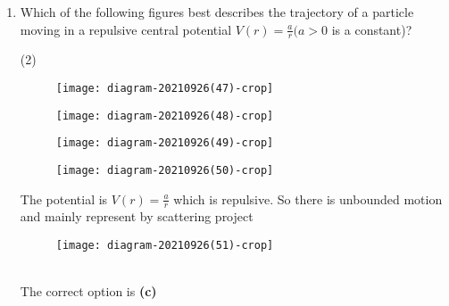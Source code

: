 \begin{enumerate}
\begin{tasks}
	\task[\textbf{A.}] $3 N$
	\task[\textbf{B.}]$2 N$
	\task[\textbf{C.}]$5 N$
	\task[\textbf{D.}]$4 N$
\end{tasks}
\begin{answer}
\begin{align*}
m&=\frac{100}{1000}=0.1 \mathrm{~kg}\\
m g h&=\frac{1}{2} m v^{2} \\
v&=\sqrt{2 g h} \\
v & =10 \mathrm{~m} / \mathrm{sec}
\intertext{change in momentum during collision}
 (m v)-(-m v)&=2 k . g m / \mathrm{sec}\\
f&=\frac{\Delta P}{\Delta t}=\frac{2}{0.5}=4 N
\end{align*}
The correct option is \textbf{(d)}	
\end{answer}
	\item Which of the following figures best describes the trajectory of a particle moving in a repulsive central potential $V(r)=\frac{a}{r}(a>0$ is a constant)?
	{}
\begin{tasks}(2)
	\task[\textbf{A.}]\begin{figure}[H]
		\centering
		\texttt{[image: diagram-20210926(47)-crop]}
	\end{figure}
	\task[\textbf{B.}]\begin{figure}[H]
		\centering
		\texttt{[image: diagram-20210926(48)-crop]}
	\end{figure}
	\task[\textbf{C.}]\begin{figure}[H]
		\centering
		\texttt{[image: diagram-20210926(49)-crop]}
	\end{figure}
	\task[\textbf{D.}]\begin{figure}[H]
		\centering
		\texttt{[image: diagram-20210926(50)-crop]}
	\end{figure}
\end{tasks}
\begin{answer}
\begin{minipage}{0.5\textwidth}
	 The potential is $V(r)=\frac{a}{r}$ which is repulsive. So there is unbounded motion and mainly represent by scattering project
\end{minipage}
\begin{minipage}{0.5\textwidth}
\begin{figure}[H]
	\centering
	\texttt{[image: diagram-20210926(51)-crop]}
\end{figure}
\end{minipage}\\
The correct option is \textbf{(c)}
\end{answer}


\end{enumerate}

